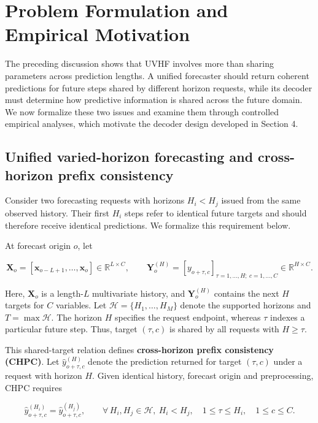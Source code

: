 \documentclass[final,3p,times]{elsarticle}
\begin{document}
\section{Problem Formulation and Empirical Motivation}
\label{sec:problem-formulation}


The preceding discussion shows that UVHF involves more than sharing parameters across prediction lengths. A unified forecaster should return coherent predictions for future steps shared by different horizon requests, while its decoder must determine how predictive information is shared across the future domain. We now formalize these two issues and examine them through controlled empirical analyses, which motivate the decoder design developed in Section 4.

\subsection{Unified varied-horizon forecasting and cross-horizon prefix consistency}


Consider two forecasting requests with horizons $H_i<H_j$ issued from the same observed history. Their first $H_i$ steps refer to identical future targets and should therefore receive identical predictions. We formalize this requirement below.

At forecast origin $o$, let

\[
\mathbf X_o
=
\left[\mathbf x_{o-L+1},\ldots,\mathbf x_o\right]
\in\mathbb R^{L\times C},
\qquad
\mathbf Y_o^{(H)}
=
\left[y_{o+\tau,c}\right]_{\tau=1,\ldots,H;\ c=1,\ldots,C}
\in\mathbb R^{H\times C}.
\]


Here, $\mathbf X_o$ is a length-$L$ multivariate history, and $\mathbf Y_o^{(H)}$ contains the next $H$ targets for $C$ variables. Let $\mathcal H=\{H_1,\ldots,H_M\}$ denote the supported horizons and $T=\max\mathcal H$. The horizon $H$ specifies the request endpoint, whereas $\tau$ indexes a particular future step. Thus, target $(\tau,c)$ is shared by all requests with $H\geq\tau$.

This shared-target relation defines \textbf{cross-horizon prefix consistency (CHPC)}. Let $\widehat y_{o+\tau,c}^{(H)}$ denote the prediction returned for target $(\tau,c)$ under a request with horizon $H$. Given identical history, forecast origin and preprocessing, CHPC requires

\[
\widehat y_{o+\tau,c}^{(H_i)}
=
\widehat y_{o+\tau,c}^{(H_j)},
\qquad
\forall\,H_i,H_j\in\mathcal H,\ H_i<H_j,\quad
1\leq\tau\leq H_i,\quad
1\leq c\leq C.
\]
\end{document}
